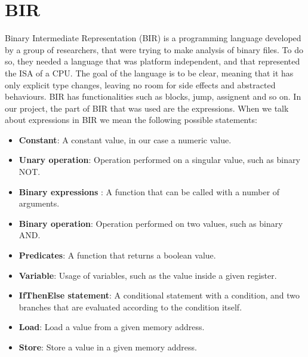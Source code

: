 \section{BIR}
\label{cha:BIR} Binary Intermediate Representation (BIR) is a programming language
developed by a group of researchers, that were trying to make analysis of binary
files. To do so, they needed a language that was platform independent, and that represented
the ISA of a CPU. The goal of the language is to be clear, meaning that it has only
explicit type changes, leaving no room for side effects and abstracted
behaviours. BIR has functionalities such as blocks, jump, assignent and so on.
In our project, the part of BIR that was used are the expressions. When we talk
about expressions in BIR we mean the following possible statements:
\begin{itemize}
  \item \textbf{Constant}: A constant value, in our case a numeric value.

  \item \textbf{Unary operation}: Operation performed on a singular value, such
    as binary NOT.

  \item \textbf{Binary expressions }: A function that can be called with a number
    of arguments.

  \item \textbf{Binary operation}: Operation performed on two values, such as
    binary AND.

  \item \textbf{Predicates}: A function that returns a boolean value.

  \item \textbf{Variable}: Usage of variables, such as the value inside a given
    register.

  \item \textbf{IfThenElse statement}: A conditional statement with a condition,
    and two branches that are evaluated according to the condition itself.

  \item \textbf{Load}: Load a value from a given memory address.

  \item \textbf{Store}: Store a value in a given memory address.
\end{itemize}

